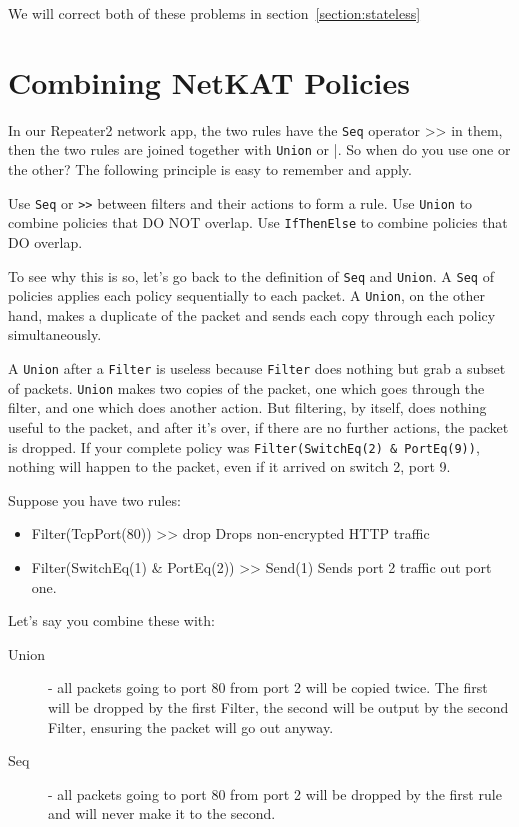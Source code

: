We will correct both of these problems in section~\ref{section:stateless}

\section{Combining NetKAT Policies}
\label{section:combining}

In our Repeater2 network app, the two rules have the \texttt{Seq} operator >> in them, then the two rules 
are joined together with \texttt{Union} or |.  
So when do you use one or the other?
The following principle is easy to remember and apply.

\begin{principle}
Use \texttt{Seq} or \texttt{>>} between filters and their actions to form a rule.
Use \texttt{Union} to combine policies that DO NOT overlap.
Use \texttt{IfThenElse} to combine policies that DO overlap. 
\end{principle}

To see why this is so, let's go back to the definition of \texttt{Seq} and \texttt{Union}.
A \texttt{Seq} of policies applies each policy sequentially to each packet.
A \texttt{Union}, on the other hand, makes a duplicate of the packet and sends each copy through each policy 
simultaneously.

A \texttt{Union} after a \texttt{Filter} is useless because \texttt{Filter} does nothing but grab a subset 
of packets.
\texttt{Union} makes two copies of the packet, one which goes through the filter, and one which does another action.
But filtering, by itself, does nothing useful to the packet, and after it's over, if there are no 
further actions, the packet is dropped. 
If your complete policy was \texttt{Filter(SwitchEq(2) \& PortEq(9))}, nothing will happen to the packet, even
if it arrived on switch 2, port 9.  

Suppose you have two rules:

\begin{itemize}
  \item Filter(TcpPort(80)) >> drop Drops non-encrypted HTTP traffic 
  \item Filter(SwitchEq(1) \& PortEq(2)) >> Send(1) Sends port 2 traffic out port one.
\end{itemize}

Let's say you combine these with:

\begin{description}
  \item[Union] - all packets going to port 80 from port 2 will be copied twice.  
  The first will be dropped by the first Filter, the second will be output by the second Filter, ensuring the
  packet will go out anyway. 
  \item[Seq] - all packets going to port 80 from port 2 will be dropped by the first rule and will never
  make it to the second.   
\end{description}

